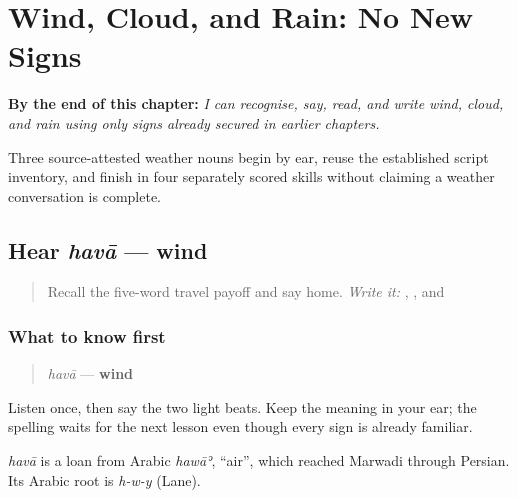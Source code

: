 
\chapter{Wind, Cloud, and Rain: No New Signs}
\label{ch:mw-weather-three}

\begin{chapteropening}
\textbf{By the end of this chapter:} \emph{I can recognise, say, read, and write wind, cloud, and rain using only signs already secured in earlier chapters.}

Three source-attested weather nouns begin by ear, reuse the established script inventory, and finish in four separately scored skills without claiming a weather conversation is complete.
\end{chapteropening}

\section[havā]{Hear \emph{havā} — wind}

\label{lesson:MW-C11-hear-hawa}



\begin{quote}
Recall the five-word travel payoff and say home. \emph{Write it:} \textbf{}, \textbf{}, and \textbf{}
\end{quote}

\subsection*{What to know first}
\begin{quote}
\emph{havā} — \textbf{wind}
\end{quote}

Listen once, then say the two light beats. Keep the meaning in your ear; the spelling waits for the next lesson even though every sign is already familiar.

\begin{cousinweb}
\emph{havā} is a loan from Arabic \emph{hawāʾ}, \textquotedblleft{}air\textquotedblright{}, which reached Marwadi through Persian. Its Arabic root is \emph{h-w-y} (Lane).
\end{cousinweb}

